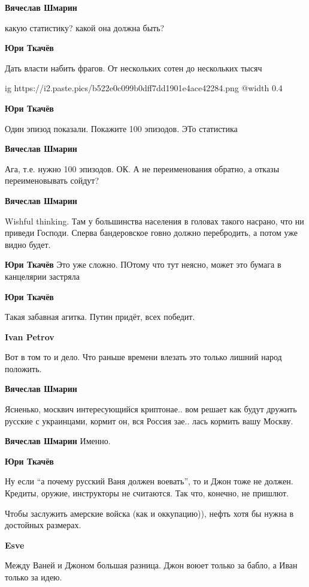 \begin{itemize}
\textbf{Вячеслав Шмарин}

какую статистику? какой она должна быть?

\textbf{Юри Ткачёв}

Дать власти набить фрагов. От нескольких сотен до нескольких тысяч

\ifcmt
  ig https://i2.paste.pics/b522e0c099b0dff7dd1901e4ace42284.png
  @width 0.4
\fi

\textbf{Юри Ткачёв}

Один эпизод показали. Покажите 100 эпизодов. ЭТо статистика

\textbf{Вячеслав Шмарин}

Ага, т.е. нужно 100 эпизодов. ОК. А не переименования обратно, а отказы переименовывать сойдут?

\textbf{Вячеслав Шмарин}

Wishful thinking. Там у большинства населения в головах такого насрано, что ни
приведи Господи. Сперва бандеровское говно должно перебродить, а потом уже
видно будет.

\textbf{Юри Ткачёв}
Это уже сложно. ПОтому что тут неясно, может это бумага в канцелярии застряла

\textbf{Юри Ткачёв}

Такая забавная агитка. Путин придёт, всех победит.

\textbf{Ivan Petrov}

Вот в том то и дело. Что раньше времени влезать это только лишний народ
положить.

\textbf{Вячеслав Шмарин}

Ясненько, москвич интересующийся криптонае.. вом решает как будут дружить
русские с украинцами, кормит он, вся Россия зае.. лась кормить вашу Москву.

\textbf{Вячеслав Шмарин}
Именно.

\textbf{Юри Ткачёв}

Ну если \enquote{а почему русский Ваня должен воевать}, то и Джон тоже не должен.
Кредиты, оружие, инструкторы не считаются. Так что, конечно, не пришлют. 

Чтобы заслужить амерские войска (как и оккупацию)), нефть хотя бы нужна в
достойных размерах.

\textbf{Esve}

Между Ваней и Джоном большая разница. Джон воюет только за бабло, а Иван только
за идею.


\end{itemize}
